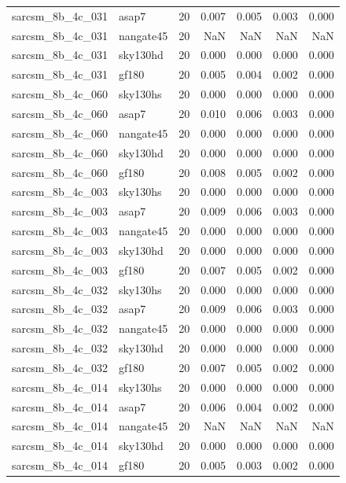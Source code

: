 \begin{tabular}{llrrrrr}
sarcsm\_8b\_4c\_031 & asap7 & 20 & 0.007 & 0.005 & 0.003 & 0.000 \\
sarcsm\_8b\_4c\_031 & nangate45 & 20 & NaN & NaN & NaN & NaN \\
sarcsm\_8b\_4c\_031 & sky130hd & 20 & 0.000 & 0.000 & 0.000 & 0.000 \\
sarcsm\_8b\_4c\_031 & gf180 & 20 & 0.005 & 0.004 & 0.002 & 0.000 \\
sarcsm\_8b\_4c\_060 & sky130hs & 20 & 0.000 & 0.000 & 0.000 & 0.000 \\
sarcsm\_8b\_4c\_060 & asap7 & 20 & 0.010 & 0.006 & 0.003 & 0.000 \\
sarcsm\_8b\_4c\_060 & nangate45 & 20 & 0.000 & 0.000 & 0.000 & 0.000 \\
sarcsm\_8b\_4c\_060 & sky130hd & 20 & 0.000 & 0.000 & 0.000 & 0.000 \\
sarcsm\_8b\_4c\_060 & gf180 & 20 & 0.008 & 0.005 & 0.002 & 0.000 \\
sarcsm\_8b\_4c\_003 & sky130hs & 20 & 0.000 & 0.000 & 0.000 & 0.000 \\
sarcsm\_8b\_4c\_003 & asap7 & 20 & 0.009 & 0.006 & 0.003 & 0.000 \\
sarcsm\_8b\_4c\_003 & nangate45 & 20 & 0.000 & 0.000 & 0.000 & 0.000 \\
sarcsm\_8b\_4c\_003 & sky130hd & 20 & 0.000 & 0.000 & 0.000 & 0.000 \\
sarcsm\_8b\_4c\_003 & gf180 & 20 & 0.007 & 0.005 & 0.002 & 0.000 \\
sarcsm\_8b\_4c\_032 & sky130hs & 20 & 0.000 & 0.000 & 0.000 & 0.000 \\
sarcsm\_8b\_4c\_032 & asap7 & 20 & 0.009 & 0.006 & 0.003 & 0.000 \\
sarcsm\_8b\_4c\_032 & nangate45 & 20 & 0.000 & 0.000 & 0.000 & 0.000 \\
sarcsm\_8b\_4c\_032 & sky130hd & 20 & 0.000 & 0.000 & 0.000 & 0.000 \\
sarcsm\_8b\_4c\_032 & gf180 & 20 & 0.007 & 0.005 & 0.002 & 0.000 \\
sarcsm\_8b\_4c\_014 & sky130hs & 20 & 0.000 & 0.000 & 0.000 & 0.000 \\
sarcsm\_8b\_4c\_014 & asap7 & 20 & 0.006 & 0.004 & 0.002 & 0.000 \\
sarcsm\_8b\_4c\_014 & nangate45 & 20 & NaN & NaN & NaN & NaN \\
sarcsm\_8b\_4c\_014 & sky130hd & 20 & 0.000 & 0.000 & 0.000 & 0.000 \\
sarcsm\_8b\_4c\_014 & gf180 & 20 & 0.005 & 0.003 & 0.002 & 0.000 \\

\end{tabular}
